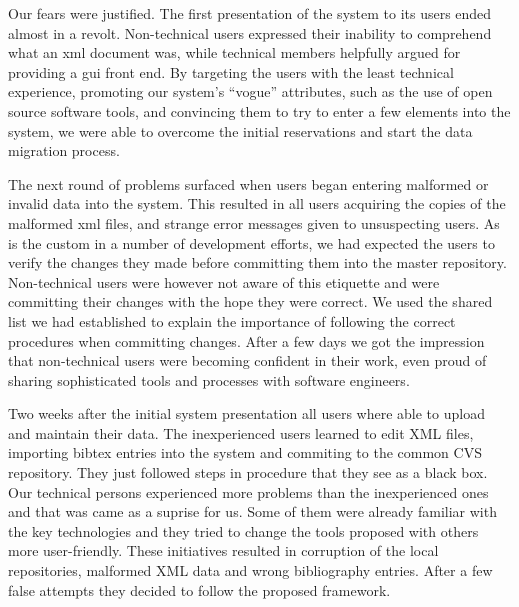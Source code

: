 \documentclass[10pt]{article}
\begin{document}
Our fears were justified.
The first presentation of the system to its users ended
almost in a revolt.
Non-technical users expressed their inability to comprehend
what an {\sc xml} document was, while technical members
helpfully argued for providing a {\sc gui} front end.
By targeting the users with the least technical experience,
promoting our system's ``vogue'' attributes,
such as the use of open source software tools,
and convincing them to try to enter a few elements into
the system, we were able to overcome the initial reservations
and start the data migration process.

The next round of problems surfaced when users began entering
malformed or invalid data into the system.
This resulted in all users acquiring the copies of the malformed
{\sc xml} files, and strange error messages given to unsuspecting
users.
As is the custom in a number of development efforts, we had
expected the users to verify the changes they made before
committing them into the master repository.
Non-technical users were however not aware of this etiquette
and were committing their changes with the hope they were correct.
We used the shared list we had established to explain the
importance of following the correct procedures when committing changes.
After a few days we got the impression that non-technical users
were becoming confident in their work, even proud of sharing
sophisticated tools and processes with software engineers.

Two weeks after the initial system presentation all users where able to upload 
and maintain their data. The inexperienced users learned to edit XML files,
importing bibtex entries into the system and commiting to the common CVS repository. 
They just followed steps in procedure that they see as a black box. 
Our technical persons experienced more problems than the inexperienced ones 
and that was came as a suprise for us. Some of them were already familiar 
with the key technologies and they tried to change the tools proposed with others more user-friendly. 
These initiatives resulted in corruption of the local repositories, malformed XML data and wrong bibliography entries.
After a few false attempts they decided to follow the proposed framework.
\end{document}
